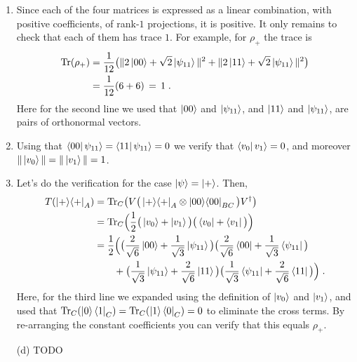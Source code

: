 \documentclass[12pt]{article}
\begin{document}
\begin{enumerate}
\begin{enumerate}
\item Since each of the four matrices is expressed as a linear combination, with positive coefficients, of rank-$1$ projections, it is positive. It only remains to check that each of them has trace $1$. For example, for $\rho_+$ the trace is 
\begin{align*}
 \mathrm{Tr}(\rho_+) &= \frac{1}{12} \big(\| 2 \ket{00} + \sqrt{2} \ket{\psi_{11}}\|^2 +\| 2 \ket{11} + \sqrt{2} \ket{\psi_{11}}\|^2 \big) \\
&= \frac{1}{12} (6+6)\,=\,1\;.
\end{align*}
Here for the second line we used that $\ket{00}$ and $\ket{\psi_{11}}$, and $\ket{11}$ and $\ket{\psi_{11}}$, are pairs of orthonormal vectors. 
\item Using that $\bra{00}\psi_{11}\rangle = \bra{11}\psi_{11}\rangle = 0$ we verify that 
$\bra{v_0}v_1\rangle =0$, and moreover $\|\ket{v_0}\|=\|\ket{v_1}\|=1$.
\item  Let's do the verification for the case $\ket{\psi}=\ket{+}$. Then,
\begin{align*}
T(\ket{+}\!\bra{+}_A) &= \mathrm{Tr}_C \big( V\big( \ket{+}\!\bra{+}_A \otimes \ket{00}\!\bra{00}_{BC} \big) V^\dagger \big)\\
&= \mathrm{Tr}_C \Big( \frac{1}{2}\big( \ket{v_0}+\ket{v_1} \big) \big( \bra{v_0} + \bra{v_1} \big) \Big)\\
&= \frac{1}{2} \Big( \big(\frac{2}{\sqrt{6}} \ket{00} + \frac{1}{\sqrt{3}} \ket{\psi_{11}} \big)\big(\frac{2}{\sqrt{6}} \bra{00} + \frac{1}{\sqrt{3}} \bra{\psi_{11}}\big) \\
&\qquad + \big(\frac{1}{\sqrt{3}} \ket{\psi_{11}} +\frac{2}{\sqrt{6}} \ket{11} \big)\big( \frac{1}{\sqrt{3}} \bra{\psi_{11}}+\frac{2}{\sqrt{6}} \bra{11} \big) \Big)\;.
\end{align*}
Here, for the third line we expanded using the definition of $\ket{v_0}$ and $\ket{v_1}$, and used that $\mathrm{Tr}_C(\ket{0}\bra{1}_C)=\mathrm{Tr}_C(\ket{1}\bra{0}_C)=0$ to eliminate the cross terms. 
By re-arranging the constant coefficients you can verify that this equals $\rho_+$. 
\item[(d)] TODO
\end{enumerate}


\end{enumerate}
\end{document}
